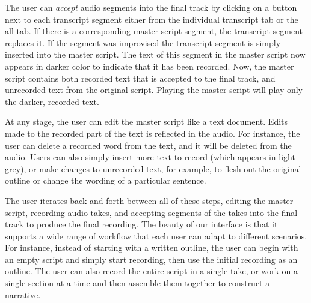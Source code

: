 The user can \textit{accept} audio segments into the final track by clicking on a button next to each transcript segment either from the individual transcript tab or the all-tab. If there is a corresponding master script segment, the transcript segment replaces it. If the segment was improvised the transcript segment is simply inserted into the master script.
The text of this segment in the master script now appears in darker color to indicate that it has been recorded. Now, the master script contains both recorded text that is accepted to the final track, and unrecorded text from the original script.
Playing the master script will play only the darker, recorded text. 

 At any stage, the user can edit the master script like a text document. Edits made to the recorded part of the text is reflected in the audio. For instance, the user can delete a recorded word from the text, and it will be deleted from the audio.  Users can also simply insert more text to record (which appears in light grey), or make changes to unrecorded text, for example, to flesh out the original outline or change the wording of a particular sentence. 

The user iterates back and forth between all of these steps, editing the master script, recording audio takes, and accepting segments of the takes into the final track to produce the final recording.
The beauty of our interface is that it supports a wide range of workflow that each user can adapt to different scenarios. For instance, instead of starting with a written outline, the user can begin with an empty script and simply start recording,  then use  the initial recording as an outline. The user can also record the entire script in a single take, or work on a single section at a time and then assemble them together to construct a narrative.
